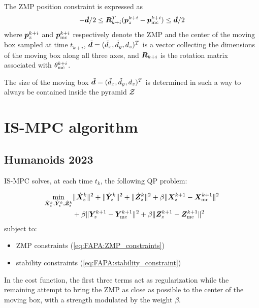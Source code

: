 The ZMP position constraint is expressed as
\begin{equation}\label{eq:WoS:ZMP_constraint}
-\tilde{{\bm{d}}} /2 \le {\bm{R}}_{k+i}^T({\bm{p}}_z^{k+i} - {\bm{p}}_{\rm mc}^{k+i}) \le \tilde{{\bm{d}}} /2
\end{equation}
where ${\bm{p}}_z^{k+i}$ and ${\bm{p}}_{\rm mc}^{k+i}$ respectively denote the ZMP and the center of the moving box sampled at time $t_{k+i}$, $\tilde {{\bm{d}}} = (\tilde d_x, \tilde d_y, d_z)^T$
is a vector collecting the dimensions of the moving box along all three axes, and ${\bm{R}}_{k+i}$ is the rotation matrix associated with $\theta_{\rm mc}^{k+i}$.

The size of the moving box $\tilde {{\bm{d}}} = (\tilde d_x, \tilde d_y, d_z)^T$ is determined in such a way to always be contained inside the pyramid $\cal Z$



\section{IS-MPC algorithm}
\subsection{Humanoids 2023}
IS-MPC solves, at each time $t_k$, the following QP problem:
\begin{braced}
\begin{equation*}\begin{split}
\min_{\dot{\bm{X}}_\text{z}^k, \dot{\bm{Y}}_\text{z}^k, \dot{\bm{Z}}_\text{z}^k}
&\|\dot{\bm{X}}_z^k\|^2 + \|\dot{\bm{Y}}_z^k\|^2 + \|\dot{\bm{Z}}_z^k\|^2+\beta \|\bm{X}_z^{k+1} - {\bm{X}}_{\rm mc}^{k+1}\|^2 \\& + \beta \|\bm{Y}_z^{k+1} - {\bm{Y}}_{\rm mc}^{k+1}\|^2 + \beta \|\bm{Z}_z^{k+1} - {\bm{Z}}_{\rm mc}^{k+1}\|^2 \\
\end{split}\end{equation*}
\hspace{0.25cm} subject to:
\begin{itemize}
\item ZMP constraints (\ref{eq:FAPA:ZMP_constraints})
\item stability constraints (\ref{eq:FAPA:stability_constraint})
\end{itemize}
\end{braced}

In the cost function, the first three terms act as regularization while the remaining attempt to bring the ZMP as close as possible to the center of the moving box, with a strength modulated by the weight $\beta$.

